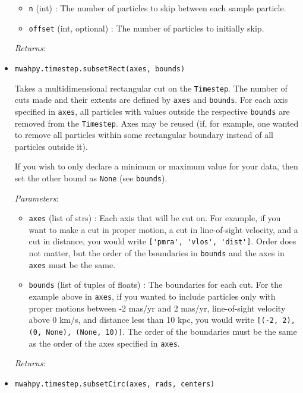 \documentclass{article}
\begin{document}
\begin{itemize}
\begin{itemize}
\item \verb!n! (int) : The number of particles to skip between each sample particle.

\item \verb!offset! (int, optional) : The number of particles to initially skip.

\end{itemize}

\textit{Returns}: 



\item \verb!mwahpy.timestep.subsetRect(axes, bounds)!

Takes a multidimensional rectangular cut on the \verb!Timestep!. The number of cuts made and their extents are defined by \verb!axes! and \verb!bounds!. For each axis specified in \verb!axes!, all particles with values outside the respective \verb!bounds! are removed from the \verb!Timestep!. Axes may be reused (if, for example, one wanted to remove all particles within some rectangular boundary instead of all particles outside it).

If you wish to only declare a minimum or maximum value for your data, then set the other bound as \verb!None! (see \verb!bounds!).

\textit{Parameters}: \begin{itemize}

\item \verb!axes! (list of strs) : Each axis that will be cut on. For example, if you want to make a cut in proper motion, a cut in line-of-sight velocity, and a cut in distance, you would write \verb!['pmra', 'vlos', 'dist']!. Order does not matter, but the order of the boundaries in \verb!bounds! and the axes in \verb!axes! must be the same.

\item \verb!bounds! (list of tuples of floats) : The boundaries for each cut. For the example above in \verb!axes!, if you wanted to include particles only with proper motions between -2 mas/yr and 2 mas/yr, line-of-sight velocity above 0 km/s, and distance less than 10 kpc, you would write \verb![(-2, 2), (0, None), (None, 10)]!. The order of the boundaries must be the same as the order of the axes specified in \verb!axes!.

\end{itemize}

\textit{Returns}: 



\item \verb!mwahpy.timestep.subsetCirc(axes, rads, centers)!


\end{itemize}
\end{document}
